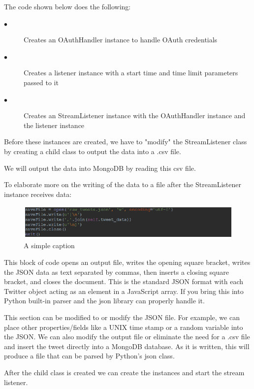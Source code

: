 The code shown below does the following:

\begin{description}
	
\item[$\bullet$]Creates an OAuthHandler instance to handle OAuth credentials

\item[$\bullet$]Creates a listener instance with a start time and time limit parameters passed to it

\item[$\bullet$]Creates an StreamListener instance with the OAuthHandler instance and the listener instance
\end{description}

Before these instances are created, we have to "modify" the StreamListener class by creating a child class to output the data into a .csv file.

We will output the data into MongoDB by reading this csv file.

To elaborate more on the writing of the data to a file after the StreamListener instance receives data:

\begin{figure}[ht!]
	\centering
	\includegraphics[width=150mm]{code5.png}
	\caption{A simple caption \label{overflow}}
\end{figure}

This block of code opens an output file, writes the opening square bracket, writes the JSON data as text separated by commas, then inserts a closing square bracket, and closes the document. This is the standard JSON format with each Twitter object acting as an element in a JavaScript array. If you bring this into Python built-in parser and the json library can properly handle it.

This section can be modified to or modify the JSON file. For example, we can place other properties/fields like a UNIX time stamp or a random variable into the JSON. We can also modify the output file or eliminate the need for a .csv file and insert the tweet directly into a MongoDB database. As it is written, this will produce a file that can be parsed by Python's json class.

After the child class is created we can create the instances and start the stream listener.


